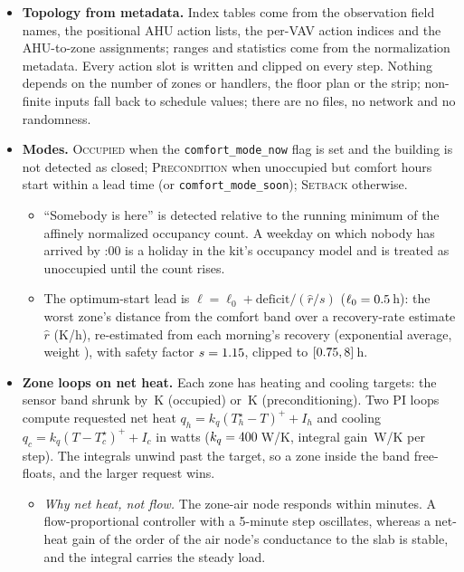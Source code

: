 \documentclass{article}
\begin{document}
\begin{itemize}
\item \textbf{Topology from metadata.} Index tables come from the observation field names, the positional AHU action lists, the per-VAV action indices and the AHU-to-zone assignments; ranges and statistics come from the normalization metadata. Every action slot is written and clipped on every step. Nothing depends on the number of zones or handlers, the floor plan or the strip; non-finite inputs fall back to schedule values; there are no files, no network and no randomness.
\item \textbf{Modes.} \textsc{Occupied} when the \texttt{comfort\_mode\_now} flag is set and the building is not detected as closed; \textsc{Precondition} when unoccupied but comfort hours start within a lead time (or \texttt{comfort\_mode\_soon}); \textsc{Setback} otherwise.
  \begin{itemize}
  \item ``Somebody is here'' is detected relative to the running minimum of the affinely normalized occupancy count. A weekday on which nobody has arrived by \ParHolidayCheckH{}:00 is a holiday in the kit's occupancy model and is treated as unoccupied until the count rises.
  \item The optimum-start lead is $\ell = \ell_0 + \text{deficit}/(\hat{r}/s)$ ($\ell_0 = 0.5$\,h): the worst zone's distance from the comfort band over a recovery-rate estimate $\hat{r}$ (K/h), re-estimated from each morning's recovery (exponential average, weight \ParRateEma), with safety factor $s=1.15$, clipped to $[0.75, 8]$\,h.
  \end{itemize}
\item \textbf{Zone loops on net heat.} Each zone has heating and cooling targets: the sensor band shrunk by \ParMarginOcc\,K (occupied) or \ParMarginPre\,K (preconditioning). Two PI loops compute requested net heat $q_h = k_q (T_h^\star - T)^+ + I_h$ and cooling $q_c = k_q (T - T_c^\star)^+ + I_c$ in watts ($k_q = 400$\,W/K, integral gain \ParKiWPerKStep\,W/K per step). The integrals unwind past the target, so a zone inside the band free-floats, and the larger request wins.
  \begin{itemize}
  \item \emph{Why net heat, not flow.} The zone-air node responds within minutes. A flow-proportional controller with a 5-minute step oscillates, whereas a net-heat gain of the order of the air node's conductance to the slab is stable, and the integral carries the steady load.

\end{itemize}
\end{itemize}
\end{document}
